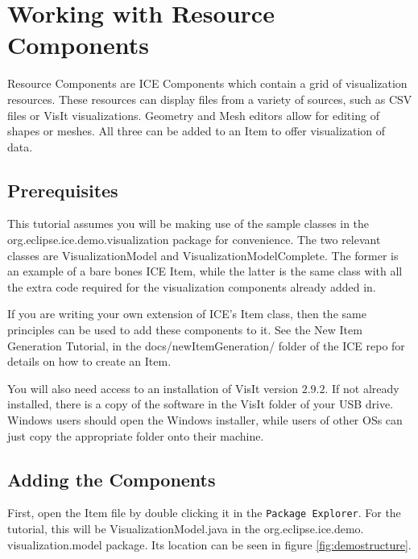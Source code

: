 \chapter{Working with Resource Components}
Resource Components are ICE Components which contain a grid of visualization
resources. These resources can display files from a variety of sources,
such as CSV files or VisIt visualizations. Geometry and Mesh editors allow for
editing of shapes or meshes. All three can be added to an Item to offer
visualization of data.

\section{Prerequisites}

This tutorial assumes you will be making use of the sample classes in the
org.eclipse.ice.demo.visualization package for convenience. The two relevant
classes are VisualizationModel and VisualizationModelComplete. The former is an
example of a bare bones ICE Item, while the latter is the same class with all
the extra code required for the visualization components already added in.

If you are writing your own extension of ICE's Item class, then the same
principles can be used to add these components to it. See the New Item
Generation Tutorial, in the docs/newItemGeneration/ folder of the ICE repo for
details on how to create an Item.

You will also need access to an installation of VisIt version $2.9.2$. If
not already installed, there is a copy of the software in the VisIt folder of
your USB drive. Windows users should open the Windows installer, while users of
other OSs can just copy the appropriate folder onto their machine.

\section{Adding the Components}

First, open the Item file by double clicking it in the \texttt{Package
Explorer}. For the tutorial, this will be VisualizationModel.java in the
org.eclipse.ice.demo. visualization.model package. Its location can be seen in
figure \ref{fig:demostructure}.

